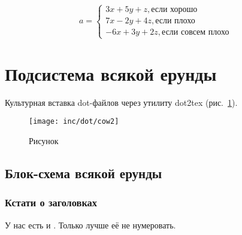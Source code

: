 \begin{equation}
a= \begin{cases}
 3x + 5y + z, \mbox{если хорошо} \\
 7x - 2y + 4z, \mbox{если плохо}\\
 -6x + 3y + 2z, \mbox{если совсем плохо}
\end{cases}
\label{F:F2}
\end{equation}

\section{Подсистема всякой ерунды}

Культурная вставка dot-файлов через утилиту dot2tex (рис.~\ref{fig:fig02}).

\begin{figure}
  \centering
  \texttt{[image: inc/dot/cow2]}
  \caption{Рисунок}
  \label{fig:fig02}
\end{figure}


\subsection{Блок-схема всякой ерунды}

\subsubsection*{Кстати о заголовках}

У нас есть и . Только лучше её не нумеровать.

